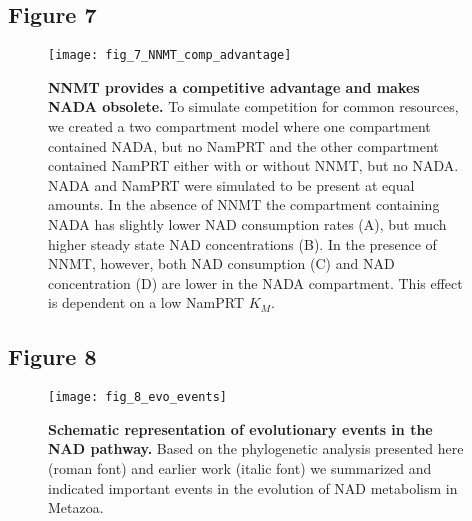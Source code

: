 \newpage


\subsection*{Figure 7}

\begin{figure}[ht]
  \centering
  \texttt{[image: fig\_7\_NNMT\_comp\_advantage]}
  \caption{\textbf{NNMT provides a competitive advantage and makes NADA obsolete.} To simulate competition for common resources, we created a two compartment model where one compartment contained NADA, but no NamPRT and the other compartment contained NamPRT either with or without NNMT, but no NADA. NADA and NamPRT were simulated to be present at equal amounts. In the absence of NNMT the compartment containing NADA has slightly lower NAD consumption rates (A), but much higher steady state NAD concentrations (B). In the presence of NNMT, however, both NAD consumption (C) and NAD concentration (D) are lower in the NADA compartment. This effect is dependent on a low NamPRT $K_{M}$.}
  \label{fig:NNMT_comp_advantage}
\end{figure}

\newpage


\subsection*{Figure 8}

\begin{figure}[ht]
  \centering
  \texttt{[image: fig\_8\_evo\_events]}
  \caption{\textbf{Schematic representation of evolutionary events in the NAD pathway.} Based on the phylogenetic analysis presented here (roman font) and earlier work \cite{Lau2010} (italic font) we summarized and indicated important events in the evolution of NAD metabolism in Metazoa.}
  \label{fig:evo_events}
\end{figure}
